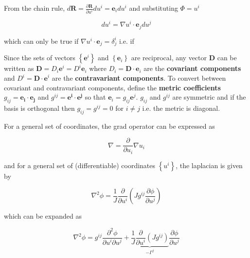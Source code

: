 \documentclass[12pt]{article}
\begin{document}
\noindent From the chain rule, $d\mathbf{R} = \frac{\partial\mathbf{R}}{\partial u^i}du^i = \mathbf{e}_idu^i$
and substituting $\Phi = u^i$

\[
du^i = \nabla u^i\cdot\mathbf{e}_jdu^j
\]

which can only be true if $\nabla u^i\cdot\mathbf{e}_j = \delta^i_j$ i.e. if

\begin{center}
\end{center}

Since the sets of vectors $\left\{\mathbf{e}^i\right\}$ and $\left\{\mathbf{e}_i\right\}$ are reciprocal,
any vector $\mathbf{D}$ can be written as $\mathbf{D} = D_i\mathbf{e}^i = D^i\mathbf{e}_i$ where
$D_i = \mathbf{D\cdot e}_i$ are the {\bf covariant components} and $D^i = \mathbf{D\cdot e}^i$ are the
{\bf contravariant components}. To convert between covariant and contravariant components, define the
{\bf metric coefficients} $g_{ij} = \mathbf{e_i\cdot e_j}$ and $g^{ij} = \mathbf{e^i\cdot e^j}$ so that
$\mathbf{e}_i = g_{ij}\mathbf{e}^j$. $g_{ij}$ and $g^{ij}$ are symmetric and if the basis is orthogonal
then $g_{ij}=g^{ij} = 0$ for $i\neq j$ i.e. the metric is diagonal.

\begin{center}
\end{center}

For a general set of coordinates, the grad operator can be expressed as

\[
\nabla = \frac{\partial}{\partial u_i}\nabla u_i
\]

\noindent and for a general set of (differentiable) coordinates $\left\{u^i\right\}$, the laplacian is given by

\begin{equation}
\nabla^2\phi = \frac{1}{J}\frac{\partial}{\partial u^i}\left(Jg^{ij}\frac{\partial\phi}{\partial u^j}\right)
\label{eq:laplacegen}
\end{equation}

\noindent which can be expanded as

\begin{equation}
\nabla^2\phi = g^{ij}\frac{\partial^2\phi}{\partial u^i\partial u^j} + 
\underbrace{\frac{1}{J}\frac{\partial}{\partial u^i}\left(Jg^{ij}\right)}_{-\Gamma^j}\frac{\partial\phi}{\partial u^j}
\label{eq:laplace_expand}
\end{equation}
\end{document}
